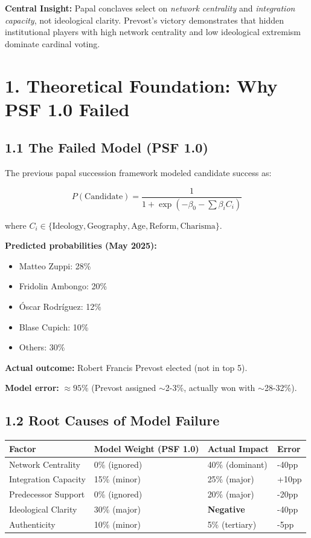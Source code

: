 \documentclass[11pt]{article}
\begin{document}
\textbf{Central Insight:} Papal conclaves select on \textit{network centrality} and \textit{integration capacity}, not ideological clarity. Prevost's victory demonstrates that hidden institutional players with high network centrality and low ideological extremism dominate cardinal voting.

\section{1. Theoretical Foundation: Why PSF 1.0 Failed}

\subsection{1.1 The Failed Model (PSF 1.0)}

The previous papal succession framework modeled candidate success as:

\begin{equation}
P(\text{Candidate}) = \frac{1}{1 + \exp(-\beta_0 - \sum \beta_i C_i)}
\end{equation}

where $C_i \in \{\text{Ideology}, \text{Geography}, \text{Age}, \text{Reform}, \text{Charisma}\}$.

\textbf{Predicted probabilities (May 2025):}
\begin{itemize}
\item Matteo Zuppi: 28\%
\item Fridolin Ambongo: 20\%
\item Óscar Rodríguez: 12\%
\item Blase Cupich: 10\%
\item Others: 30\%
\end{itemize}

\textbf{Actual outcome:} Robert Francis Prevost elected (not in top 5).

\textbf{Model error:} $\approx 95\%$ (Prevost assigned $\sim$2-3\%, actually won with $\sim$28-32\%).

\subsection{1.2 Root Causes of Model Failure}

\begin{table}[h]
\centering
\begin{tabular}{|l|l|l|l|}
\hline
\textbf{Factor} & \textbf{Model Weight (PSF 1.0)} & \textbf{Actual Impact} & \textbf{Error} \\
\hline
Network Centrality & 0\% (ignored) & 40\% (dominant) & -40pp \\
Integration Capacity & 15\% (minor) & 25\% (major) & +10pp \\
Predecessor Support & 0\% (ignored) & 20\% (major) & -20pp \\
Ideological Clarity & 30\% (major) & \textbf{Negative} & -40pp \\
Authenticity & 10\% (minor) & 5\% (tertiary) & -5pp \\
\hline
\end{tabular}
\end{table}
\end{document}
